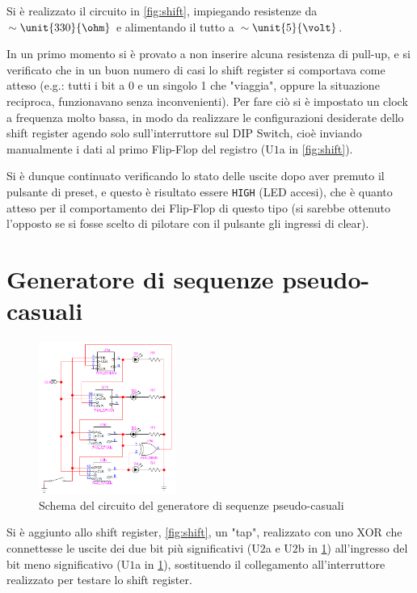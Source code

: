 \documentclass[a4paper,10pt]{article}
\def\code#1{\texttt{#1}}
\begin{document}
Si è realizzato il circuito in \cref{fig:shift}, impiegando resistenze da $\sim \unit{330}{\ohm}$ e alimentando il tutto a $\sim \unit{5}{\volt}$.

In un primo momento si è provato a non inserire alcuna resistenza di pull-up, e si verificato che in un buon numero di casi lo shift register si comportava come atteso (e.g.: tutti i bit a 0 e un singolo 1 che "viaggia", oppure la situazione reciproca, funzionavano senza inconvenienti). 
Per fare ciò si è impostato un clock a frequenza molto bassa, in modo da realizzare le configurazioni desiderate dello shift register agendo solo sull'interruttore sul DIP Switch, cioè inviando manualmente i dati al primo Flip-Flop del registro (U$1$a in \cref{fig:shift}).

Si è dunque continuato verificando lo stato delle uscite dopo aver premuto il pulsante di preset, e questo è risultato essere \code{HIGH} (LED accesi), che è quanto atteso per il comportamento dei Flip-Flop di questo tipo (si sarebbe ottenuto l'opposto se si fosse scelto di pilotare con il pulsante gli ingressi di clear).

\section{Generatore di sequenze pseudo-casuali}

\begin{figure}
	\vspace{-5pt}
	\centering
	\includegraphics[width=0.4\textwidth]{../grafici/randomseq.png}
	\vspace{-5pt}
	\caption{Schema del circuito del generatore di sequenze pseudo-casuali}
	\label{fig:random}
	\vspace{-5pt}
\end{figure}

Si è aggiunto allo shift register, \cref{fig:shift}, un "tap", realizzato con uno XOR che connettesse le uscite dei due bit più significativi (U$2$a e U$2$b in \cref{fig:random}) all'ingresso del bit meno significativo (U$1$a in \cref{fig:random}), sostituendo il collegamento all'interruttore realizzato per testare lo shift register.
\newline
\end{document}
